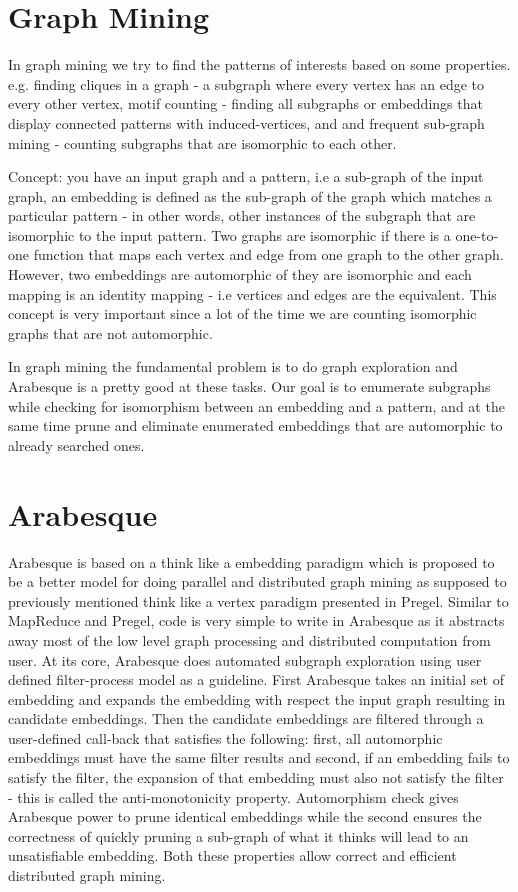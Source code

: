 \documentclass[twoside]{article}
\begin{document}
\section{Graph Mining} 
In graph mining we try to find the patterns of interests based on some properties. e.g. finding cliques in a graph - a subgraph where every vertex has an edge to every other vertex, motif counting - finding all subgraphs or embeddings that display connected patterns with induced-vertices, and and frequent sub-graph mining - counting subgraphs that are isomorphic to each other. 

Concept: you have an input graph and a pattern, i.e a sub-graph of the input graph, an embedding is defined as the sub-graph of the graph which matches a particular pattern - in other words, other instances of the subgraph that are isomorphic to the input pattern. Two graphs are isomorphic if there is a one-to-one function that maps each vertex and edge from one graph to the other graph. However, two embeddings are automorphic of they are isomorphic and each mapping is an identity mapping - i.e vertices and edges are the equivalent. This concept is very important since a lot of the time we are counting isomorphic graphs that are not automorphic.

In graph mining the fundamental problem is to do graph exploration and Arabesque is a pretty good at these tasks. Our goal is to enumerate subgraphs while checking for isomorphism between an embedding and a pattern, and at the same time prune and eliminate enumerated embeddings that are automorphic to already searched ones.

\section{Arabesque}
Arabesque is based on a think like a embedding paradigm which is proposed to be a better model for doing parallel and distributed graph mining as supposed to previously mentioned think like a vertex paradigm presented in Pregel. Similar to MapReduce and Pregel, code is very simple to write in Arabesque as it abstracts away most of the low level graph processing and distributed computation from user. At its core, Arabesque does automated subgraph exploration using user defined filter-process model as a guideline. First Arabesque takes an initial set of embedding and expands the embedding with respect the input graph resulting in candidate embeddings. Then the candidate embeddings are filtered through a user-defined call-back that satisfies the following: first, all automorphic embeddings must have the same filter results and second, if an embedding fails to satisfy the filter, the expansion of that embedding must also not satisfy the filter - this is called the anti-monotonicity property. Automorphism check gives Arabesque power to prune identical embeddings while the second ensures the correctness of quickly pruning a sub-graph of what it thinks will lead to an unsatisfiable embedding. Both these properties allow correct and efficient distributed graph mining. 
\end{document}
